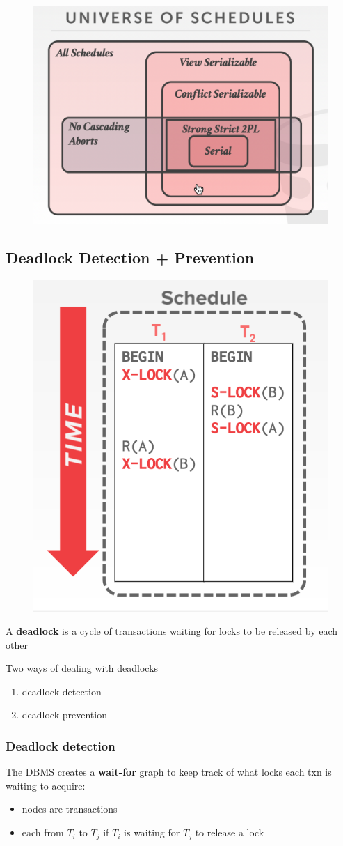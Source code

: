 \documentclass[11pt]{article}
\begin{document}
\begin{figure}[htbp]
\centering
\includegraphics[width=.8\textwidth]{../images/15445/60.png}
\label{}
\end{figure}
\subsection{Deadlock Detection + Prevention}
\label{sec:orgc640250}

\begin{figure}[htbp]
\centering
\includegraphics[width=.5\textwidth]{../images/15445/61.png}
\label{}
\end{figure}

A \textbf{deadlock} is a cycle of transactions waiting for locks to be released by each other

Two ways of dealing with deadlocks
\begin{enumerate}
\item deadlock detection
\item deadlock prevention
\end{enumerate}
\subsubsection{Deadlock detection}
\label{sec:orge0d33b1}
The DBMS creates a \textbf{wait-for} graph to keep track of what locks each txn is waiting to acquire:
\begin{itemize}
\item nodes are transactions
\item each from \(T_i\) to \(T_j\) if \(T_i\) is waiting for \(T_j\) to release a lock
\end{itemize}
\end{document}
